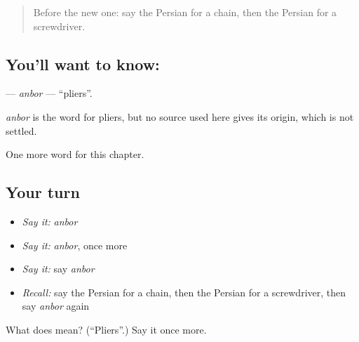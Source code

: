 \begin{quote}
Before the new one: say the Persian for a chain, then the Persian for a screwdriver.
\end{quote}

\subsection*{You'll want to know: }
\textbf{} — \emph{anbor} — \textquotedblleft{}pliers\textquotedblright{}.

\begin{cousinweb}
\emph{anbor} is the word for pliers, but no source used here gives its origin, which is not settled.
\end{cousinweb}

\begin{grammarlens}[title={What you've built}]
One more word for this chapter.
\end{grammarlens}

\subsection*{Your turn}
\begin{itemize}
\raggedright
  \item \emph{Say it:} \emph{anbor}
  \item \emph{Say it:} \emph{anbor}, once more
  \item \emph{Say it:} say \emph{anbor}
  \item \emph{Recall:} say the Persian for a chain, then the Persian for a screwdriver, then say \emph{anbor} again
\end{itemize}

\begin{tcolorbox}[breakable,colback=teal!4,colframe=teal!35!black,title={Before you move on}]
What does  mean? (\textquotedblleft{}Pliers\textquotedblright{}.) Say it once more.
\end{tcolorbox}
